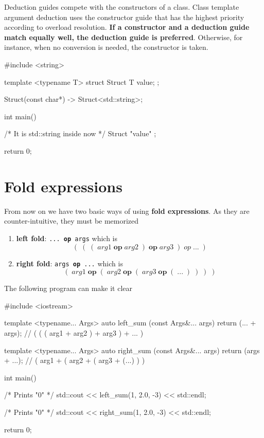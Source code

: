 \documentclass[../main]{subfiles}
\begin{document}
    Deduction guides compete with the constructors of a class. Class template argument deduction uses the constructor guide that
has the highest priority according to overload resolution. \textbf{If a constructor and a deduction guide match equally well,
the deduction guide is preferred}. Otherwise, for instance, when no conversion is needed, the constructor is taken.
\begin{Code}
    #include <string>
    
    template <typename T>
    struct Struct
    {
        T value;
    };
    
    Struct(const char*) -> Struct<std::string>;
    
    int main()
    {
        /* It is std::string inside now */
        Struct { "value" }; 
    
        return 0;
    }
\end{Code}

\section{Fold expressions}
    From now on we have two basic ways of using \textbf{fold expressions}. As they are counter-intuitive, they must be memorized
\begin{enumerate}
    \item \textbf{left fold}: \texttt{... \textbf{op} args} which is
    \begin{equation*}
        (\;(\;(\;arg1\; \textbf{op}\; arg2\;)\; \textbf{op}\; arg3\; )\; op\; ...\;)
    \end{equation*}
    \item \textbf{right fold}: \texttt{args \textbf{op} ...} which is
    \begin{equation*}
        (\;arg1\; \textbf{op}\; (\;arg2\; \textbf{op}\; (\;arg3\; \textbf{op}\; (\;...\;)\;)\;)\;)
    \end{equation*}
\end{enumerate}
\noindent
The following program can make it clear
\begin{Code}
    #include <iostream>

    template <typename... Args>
    auto left_sum (const Args&... args)
    {
        return (... + args); // ( ( ( arg1 + arg2 ) + arg3 ) + ... )
    }
    
    template <typename... Args>
    auto right_sum (const Args&... args)
    {
        return (args + ...); // ( arg1 + ( arg2 + ( arg3 + (...) ) )
    }
    
    int main()
    {
        /* Prints "0" */
        std::cout << left_sum(1, 2.0, -3) << std::endl;
        
        /* Prints "0" */
        std::cout << right_sum(1, 2.0, -3) << std::endl;
    
        return 0;
    }
\end{Code}
\end{document}
